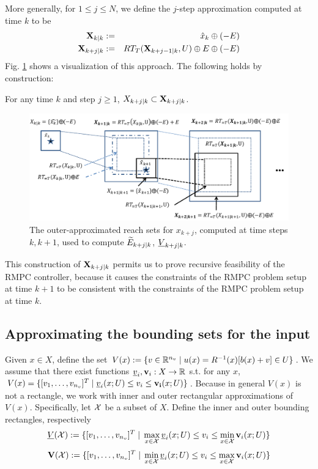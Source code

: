  More generally, for $1 \leq j \leq N$, we define the $j$-step approximation computed at time $k$ to be
 \begin{eqnarray}
 \label{eq:def Xkj}
 \mathbf{X}_{k|k} &:=&   \hat{x}_{k} \oplus (-E) 
 \nonumber
 \\
 \mathbf{X}_{k+j|k} & :=& RT_T(\mathbf{X}_{k+j-1|k},U) \oplus E \oplus (-E) 
 \end{eqnarray}
  Fig. \ref{fig:overreach_NL} shows a visualization of this approach.
 The following holds by construction:
 \begin{lemma}
 	\label{lemma:xreach}
 	For any time $k$ and step $j \geq 1$,
 	$X_{k+j|k} \subset \mathbf{X}_{k+j|k}$.
 \end{lemma}
 
 
 \begin{figure}
 	\includegraphics[scale=0.75]{figs/OverReachFigure_NL_scissored.pdf}
 	\caption{The outer-approximated reach sets for $x_{k+j}$, computed at time steps $k,k+1$, used to compute $\widetilde{E}_{k+j|k}$, $\underline{V}_{k+j|k}$. }
 	\label{fig:overreach_NL}
 \end{figure}
 
 This construction of $\mathbf{X}_{k+j|k}$ permits us to prove recursive feasibility of the RMPC controller, because it causes the constraints of the RMPC problem setup at time $k+1$ to be consistent with the constraints of the RMPC problem setup at time $k$.

\subsection{Approximating the bounding sets for the input}
\label{sec:approx input sets}
Given $x \in X$, define the set $V(x) := \{v \in \mathbb{R}^{n_v} \;|\; u(x) = R^{-1}(x)[b(x)+v] \in U\}$.
We assume that there exist functions $\underline{v}_i, \mathbf{v}_i: X \rightarrow \mathbb{R}$ s.t. for any $x$, $V(x) = \{[v_1,\ldots,v_{n_v}]^T \;|\; \underline{v}_i(x;U) \leq v_i \leq \mathbf{v_i}(x;U) \}$.
Because in general $V(x)$ is not a rectangle, we work with inner and outer rectangular approximations of $V(x)$.
Specifically, let $\mathcal{X}$ be a subset of $X$.
Define the inner and outer bounding rectangles, respectively
\[\underline{V}(\mathcal{X}) := \{[v_1,\ldots,v_{n_v}]^T \;|\; \max_{x\in \mathcal{X}} \underline{v}_i(x;U)  \leq v_i \leq \min_{x \in \mathcal{X}} \mathbf{v}_i(x;U) \} \]
\[\mathbf{V}(\mathcal{X}) := \{[v_1,\ldots,v_{n_v}]^T \;|\; \min_{x\in \mathcal{X}} \underline{v}_i(x;U)  \leq v_i \leq \max_{x \in \mathcal{X}} \mathbf{v}_i(x;U) \} \]

